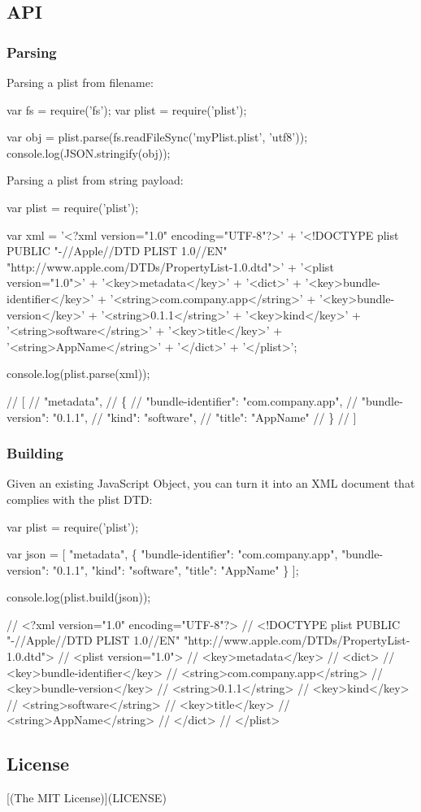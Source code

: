 \subsection*{A\+PI}

\subsubsection*{Parsing}

Parsing a plist from filename\+:


\begin{DoxyCode}
var fs = require('fs');
var plist = require('plist');

var obj = plist.parse(fs.readFileSync('myPlist.plist', 'utf8'));
console.log(JSON.stringify(obj));
\end{DoxyCode}


Parsing a plist from string payload\+:


\begin{DoxyCode}
var plist = require('plist');

var xml =
  '<?xml version="1.0" encoding="UTF-8"?>' +
  '<!DOCTYPE plist PUBLIC "-//Apple//DTD PLIST 1.0//EN" "http://www.apple.com/DTDs/PropertyList-1.0.dtd">'
       +
  '<plist version="1.0">' +
    '<key>metadata</key>' +
    '<dict>' +
      '<key>bundle-identifier</key>' +
      '<string>com.company.app</string>' +
      '<key>bundle-version</key>' +
      '<string>0.1.1</string>' +
      '<key>kind</key>' +
      '<string>software</string>' +
      '<key>title</key>' +
      '<string>AppName</string>' +
    '</dict>' +
  '</plist>';

console.log(plist.parse(xml));

// [
//   "metadata",
//   \{
//     "bundle-identifier": "com.company.app",
//     "bundle-version": "0.1.1",
//     "kind": "software",
//     "title": "AppName"
//   \}
// ]
\end{DoxyCode}


\subsubsection*{Building}

Given an existing Java\+Script Object, you can turn it into an X\+ML document that complies with the plist D\+TD\+:


\begin{DoxyCode}
var plist = require('plist');

var json = [
  "metadata",
  \{
    "bundle-identifier": "com.company.app",
    "bundle-version": "0.1.1",
    "kind": "software",
    "title": "AppName"
  \}
];

console.log(plist.build(json));

// <?xml version="1.0" encoding="UTF-8"?>
// <!DOCTYPE plist PUBLIC "-//Apple//DTD PLIST 1.0//EN" "http://www.apple.com/DTDs/PropertyList-1.0.dtd">
// <plist version="1.0">
//   <key>metadata</key>
//   <dict>
//     <key>bundle-identifier</key>
//     <string>com.company.app</string>
//     <key>bundle-version</key>
//     <string>0.1.1</string>
//     <key>kind</key>
//     <string>software</string>
//     <key>title</key>
//     <string>AppName</string>
//   </dict>
// </plist>
\end{DoxyCode}


\subsection*{License}

\mbox{[}(The M\+IT License)\mbox{]}(L\+I\+C\+E\+N\+SE) 